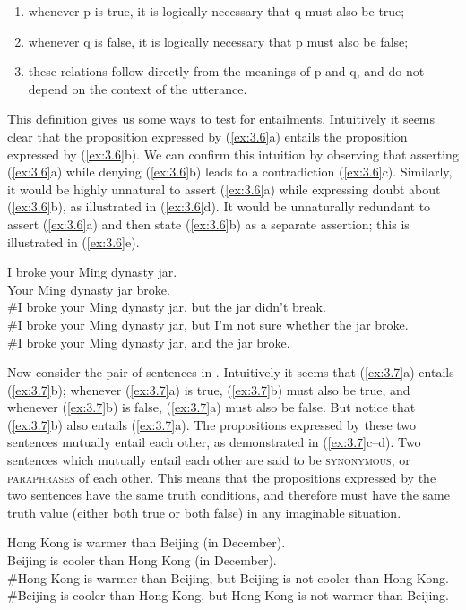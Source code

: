 \begin{enumerate}[label=(\alph*)]
 \item whenever p is true, it is logically necessary that q must also be true;
 \item whenever q is false, it is logically necessary that p must also be false;
 \item these relations follow directly from the meanings of p and q, and do not depend on the context of the utterance.
\end{enumerate}

This definition gives us some ways to test for entailments. Intuitively it seems clear that the proposition expressed by (\ref{ex:3.6}a) entails the proposition expressed by (\ref{ex:3.6}b). We can confirm this intuition by observing that asserting (\ref{ex:3.6}a) while denying (\ref{ex:3.6}b) leads to a contradiction (\ref{ex:3.6}c). Similarly, it would be highly unnatural to assert (\ref{ex:3.6}a) while expressing doubt about (\ref{ex:3.6}b), as illustrated in (\ref{ex:3.6}d). It would be unnaturally redundant to assert (\ref{ex:3.6}a) and then state (\ref{ex:3.6}b) as a separate assertion; this is illustrated in (\ref{ex:3.6}e).


\ea \label{ex:3.6}
\ea I broke your Ming dynasty jar.\\
\ex Your Ming dynasty jar broke.\\
\ex \#I broke your Ming dynasty jar, but the jar didn’t break.\\
\ex \#I broke your Ming dynasty jar, but I’m not sure whether the jar broke.\\
\ex \#I broke your Ming dynasty jar, and the jar broke.
                       \z
\z


Now consider the pair of sentences in . Intuitively it seems that (\ref{ex:3.7}a) entails (\ref{ex:3.7}b); whenever (\ref{ex:3.7}a) is true, (\ref{ex:3.7}b) must also be true, and whenever (\ref{ex:3.7}b) is false, (\ref{ex:3.7}a) must also be false. But notice that (\ref{ex:3.7}b) also entails (\ref{ex:3.7}a). The propositions expressed by these two sentences mutually entail each other, as demonstrated in (\ref{ex:3.7}c--d). Two sentences which mutually entail each other are said to be \textsc{synonymous}, or \textsc{paraphrases} of each other. This means that the propositions expressed by the two sentences have the same truth conditions, and therefore must have the same truth value (either both true or both false) in any imaginable situation.


\ea \label{ex:3.7}
\ea Hong Kong is warmer than Beijing (in December).\\
\ex Beijing is cooler than Hong Kong (in December).\\
\ex \#Hong Kong is warmer than Beijing, but Beijing is not cooler than Hong Kong.\\
\ex \#Beijing is cooler than Hong Kong, but Hong Kong is not warmer than Beijing.
                       \z
\z


